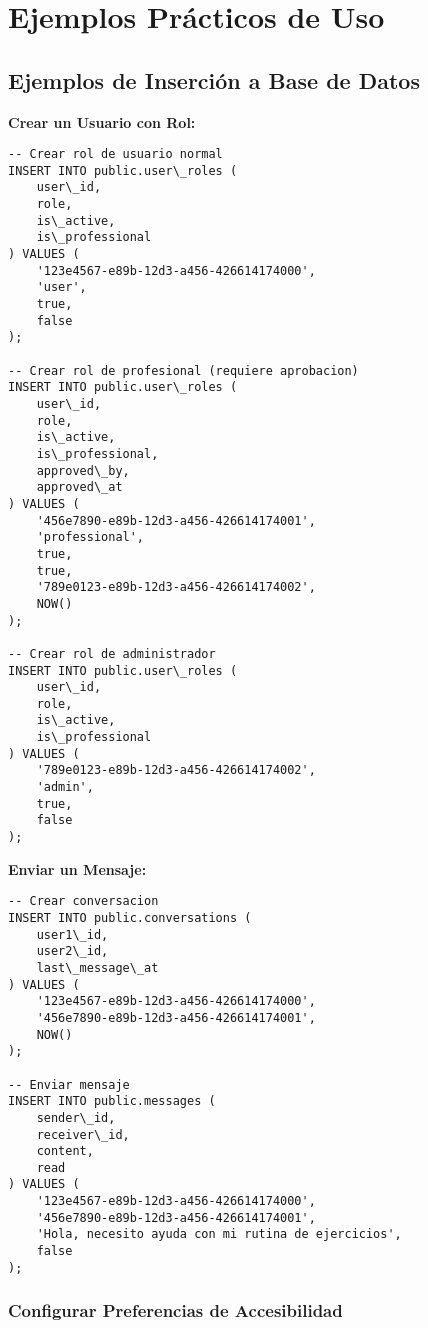 \documentclass[12pt,a4paper]{article}
\begin{document}
\section{Ejemplos Prácticos de Uso}

\subsection{Ejemplos de Inserción a Base de Datos}

\textbf{Crear un Usuario con Rol:}

\begin{lstlisting}[caption=Ejemplo de inserción de rol de usuario]
-- Crear rol de usuario normal
INSERT INTO public.user\_roles (
    user\_id,
    role,
    is\_active,
    is\_professional
) VALUES (
    '123e4567-e89b-12d3-a456-426614174000',
    'user',
    true,
    false
);

-- Crear rol de profesional (requiere aprobacion)
INSERT INTO public.user\_roles (
    user\_id,
    role,
    is\_active,
    is\_professional,
    approved\_by,
    approved\_at
) VALUES (
    '456e7890-e89b-12d3-a456-426614174001',
    'professional',
    true,
    true,
    '789e0123-e89b-12d3-a456-426614174002',
    NOW()
);

-- Crear rol de administrador
INSERT INTO public.user\_roles (
    user\_id,
    role,
    is\_active,
    is\_professional
) VALUES (
    '789e0123-e89b-12d3-a456-426614174002',
    'admin',
    true,
    false
);
\end{lstlisting}

\textbf{Enviar un Mensaje:}

\begin{lstlisting}[caption=Ejemplo de envío de mensaje]
-- Crear conversacion
INSERT INTO public.conversations (
    user1\_id,
    user2\_id,
    last\_message\_at
) VALUES (
    '123e4567-e89b-12d3-a456-426614174000',
    '456e7890-e89b-12d3-a456-426614174001',
    NOW()
);

-- Enviar mensaje
INSERT INTO public.messages (
    sender\_id,
    receiver\_id,
    content,
    read
) VALUES (
    '123e4567-e89b-12d3-a456-426614174000',
    '456e7890-e89b-12d3-a456-426614174001',
    'Hola, necesito ayuda con mi rutina de ejercicios',
    false
);
\end{lstlisting}

\subsubsection{Configurar Preferencias de Accesibilidad}
\end{document}
